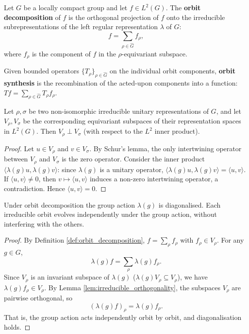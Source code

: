 \begin{definition}\label{def:orbit_decomposition}
Let $G$ be a locally compact group and let $f \in L^2(G)$. The \textbf{orbit decomposition} of $f$ is the orthogonal projection of $f$ onto the irreducible subrepresentations of the left regular representation $\lambda$ of $G$:
\[f = \sum_{\rho \in \widehat{G}} f_\rho,\]
where $f_\rho$ is the component of $f$ in the $\rho$-equivariant subspace.
\end{definition}

\begin{definition}\label{def:orbit_synthesis}
Given bounded operators $\{T_\rho\}_{\rho \in \widehat{G}}$ on the individual orbit components, \textbf{orbit synthesis} is the recombination of the acted-upon components into a function: $T f = \sum_{\rho \in \widehat{G}} T_\rho f_\rho$.
\end{definition}

\begin{lemma}\label{lem:irreducible_orthogonality}
Let $\rho, \sigma$ be two non-isomorphic irreducible unitary representations of $G$, and let $V_\rho, V_\sigma$ be the corresponding equivariant subspaces of their representation spaces in $L^2(G)$. Then $V_\rho \perp V_\sigma$ (with respect to the $L^2$ inner product).
\end{lemma}

\begin{proof}
Let $u \in V_\rho$ and $v \in V_\sigma$. By Schur's lemma, the only intertwining operator between $V_\rho$ and $V_\sigma$ is the zero operator. Consider the inner product $\langle \lambda(g)u, \lambda(g)v \rangle$: since $\lambda(g)$ is a unitary operator, $\langle \lambda(g)u, \lambda(g)v \rangle = \langle u, v \rangle$. If $\langle u, v \rangle \neq 0$, then $v \mapsto \langle u, v \rangle$ induces a non-zero intertwining operator, a contradiction. Hence $\langle u, v \rangle = 0$.
\end{proof}

\begin{proposition}\label{prop:orbit_diagonalisation}
Under orbit decomposition the group action $\lambda(g)$ is diagonalised. Each irreducible orbit evolves independently under the group action, without interfering with the others.
\end{proposition}

\begin{proof}
By Definition \ref{def:orbit_decomposition}, $f = \sum_\rho f_\rho$ with $f_\rho \in V_\rho$. For any $g \in G$,
\[
\lambda(g) f = \sum_\rho \lambda(g) f_\rho.
\]
Since $V_\rho$ is an invariant subspace of $\lambda(g)$ ($\lambda(g) V_\rho \subseteq V_\rho$), we have $\lambda(g) f_\rho \in V_\rho$. By Lemma \ref{lem:irreducible_orthogonality}, the subspaces $V_\rho$ are pairwise orthogonal, so
\[
(\lambda(g) f)_\rho = \lambda(g) f_\rho.
\]
That is, the group action acts independently orbit by orbit, and diagonalisation holds.
\end{proof}

